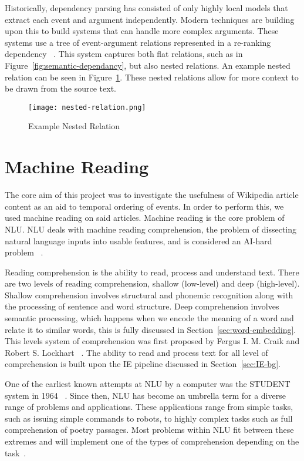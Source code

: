 \documentclass[bsc,frontabs,twoside,singlespacing,parskip,deptreport]{infthesis}     %
\begin{document}
Historically, dependency parsing has consisted of only highly local models that extract each event and argument independently.
Modern techniques are building upon this to build systems that can handle more complex arguments. These systems use a tree of
event-argument relations represented in a re-ranking dependency ~\cite{mcclosky2011event}.
This system captures both flat relations, such as in Figure~\ref{fig:semantic-dependancy}, but also nested relations.
An example nested relation can be seen in Figure~\ref{fig:nested-relation}. These nested relations allow for more context to be drawn from
the source text.


\begin{figure}[H]
  \centering
  \texttt{[image: nested-relation.png]}
  \caption{Example Nested Relation}
  \label{fig:nested-relation}
\end{figure}


\section{Machine Reading}
The core aim of this project was to investigate the usefulness of Wikipedia article content as an aid to temporal ordering of events.
In order to perform this, we used machine reading on said articles.
Machine reading is the core problem of NLU.
NLU deals with machine reading comprehension, the problem of dissecting natural language inputs into usable features,
and is considered an AI-hard problem ~\cite{yampolskiy2012ai}.

Reading comprehension is the ability to read, process and understand text.  
There are two levels of reading comprehension, shallow (low-level) and deep (high-level).
Shallow comprehension involves structural and phonemic recognition along with the processing of sentence and  word
structure.
Deep comprehension involves semantic processing, which happens when we encode the meaning of a word and relate it
to similar words, this is fully discussed in Section~\ref{sec:word-embedding}.
This levels system of comprehension was first proposed by  Fergus I. M. Craik and Robert S. Lockhart ~\cite{wagner2009beyond}.
The ability to read and process text for all level of comprehension is built upon the IE pipeline discussed in Section~\ref{sec:IE-bg}.

One of the earliest known attempts at NLU by a computer was the STUDENT system in 1964 ~\cite{russell1995modern}.
Since then, NLU has become an
umbrella term for a diverse range of problems and applications. These applications range from simple tasks, such as
issuing simple commands to robots, to highly complex tasks such as full comprehension of poetry passages.
Most problems within NLU fit between these extremes and will implement one of the types of comprehension
depending on the task~\cite{bookman2012trajectories}.
\end{document}
